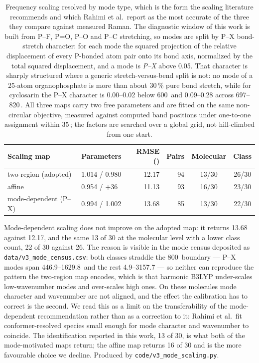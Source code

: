 \begin{table}[htbp]
\centering
\caption{Frequency scaling resolved by mode type, which is the form the scaling literature recommends and which Rahimi et al.\ report as the most accurate of the three they compare against measured Raman. The diagnostic window of this work is built from P--F, P=O, P--O and P--C stretching, so modes are split by P--X bond-stretch character: for each mode the squared projection of the relative displacement of every P-bonded atom pair onto its bond axis, normalized by the total squared displacement, and a mode is \emph{P--X} above 0.05. That character is sharply structured where a generic stretch-versus-bend split is not: no mode of a 25-atom organophosphate is more than about 30\,\% pure bond stretch, while for cyclosarin the P--X character is 0.00--0.02 below 600\,\wn{} and 0.09--0.28 across 697--820\,\wn{}. All three maps carry two free parameters and are fitted on the same non-circular objective, measured against computed band positions under one-to-one assignment within 35\,\wn{}; the factors are searched over a global grid, not hill-climbed from one start.}
\label{tab:si-modescale}
\small
\begin{tabular}{llrrcc}
\toprule
Scaling map & Parameters & RMSE (\wn{}) & Pairs & Molecular & Class \\
\midrule
two-region (adopted) & 1.014 / 0.980 & 12.17 & 94 & 13/30 & 26/30 \\
affine & 0.954 / +36 & 11.13 & 93 & 16/30 & 23/30 \\
mode-dependent (P--X) & 0.994 / 1.002 & 13.68 & 85 & 13/30 & 22/30 \\
\bottomrule
\end{tabular}

\begin{flushleft}\footnotesize Mode-dependent scaling does not improve on the adopted map: it returns 13.68\,\wn{} against 12.17, and the same 13 of 30 at the molecular level with a lower class count, 22 of 30 against 26. The reason is visible in the mode census deposited as \texttt{data/v3\_mode\_census.csv}: both classes straddle the 800\,\wn{} boundary --- P--X modes span 446.9--1629.8\,\wn{} and the rest 4.9--3157.7 --- so neither can reproduce the pattern the two-region map encodes, which is that harmonic B3LYP under-scales low-wavenumber modes and over-scales high ones. On these molecules mode character and wavenumber are not aligned, and the effect the calibration has to correct is the second. We read this as a limit on the transferability of the mode-dependent recommendation rather than as a correction to it: Rahimi et al.\ fit conformer-resolved species small enough for mode character and wavenumber to coincide. The identification reported in this work, 13 of 30, is what both of the mode-motivated maps return; the affine map returns 16 of 30 and is the more favourable choice we decline. Produced by \texttt{code/v3\_mode\_scaling.py}.\end{flushleft}
\end{table}
